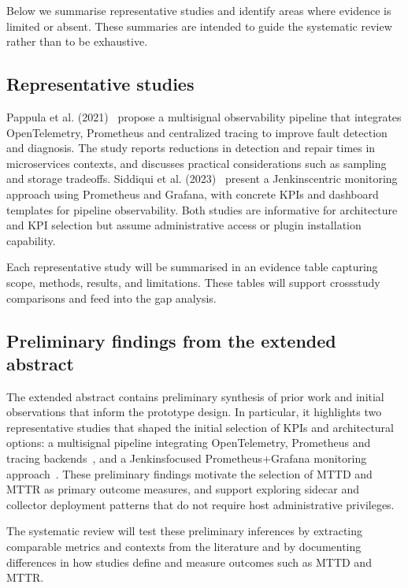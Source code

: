 Below we summarise representative studies and identify areas where evidence is limited or absent. These summaries are intended to guide the systematic review rather than to be exhaustive.

\subsection{Representative studies}
Pappula et al. (2021)~\cite{pappula2021building} propose a multi\-signal observability pipeline that integrates OpenTelemetry, Prometheus and centralized tracing to improve fault detection and diagnosis. The study reports reductions in detection and repair times in microservices contexts, and discusses practical considerations such as sampling and storage trade\-offs. Siddiqui et al. (2023)~\cite{siddiqui2023jenkins} present a Jenkins\-centric monitoring approach using Prometheus and Grafana, with concrete KPIs and dashboard templates for pipeline observability. Both studies are informative for architecture and KPI selection but assume administrative access or plugin installation capability.

Each representative study will be summarised in an evidence table capturing scope, methods, results, and limitations. These tables will support cross\-study comparisons and feed into the gap analysis.

\subsection{Preliminary findings from the extended abstract}
The extended abstract contains preliminary synthesis of prior work and initial observations that inform the prototype design. In particular, it highlights two representative studies that shaped the initial selection of KPIs and architectural options: a multi\-signal pipeline integrating OpenTelemetry, Prometheus and tracing backends~\cite{pappula2021building}, and a Jenkins\-focused Prometheus+Grafana monitoring approach~\cite{siddiqui2023jenkins}. These preliminary findings motivate the selection of \ac{MTTD} and \ac{MTTR} as primary outcome measures, and support exploring sidecar and collector deployment patterns that do not require host administrative privileges.

The systematic review will test these preliminary inferences by extracting comparable metrics and contexts from the literature and by documenting differences in how studies define and measure outcomes such as \ac{MTTD} and \ac{MTTR}.

